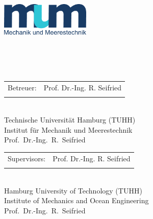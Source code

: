 \begin{titlepage}
\begin{minipage}{0.3\linewidth}
	 	 
\end{minipage}\hfill
\begin{minipage}{0.3\linewidth}
	\includegraphics[height=45pt]{Styles/mum_logo.pdf}
\end{minipage}
\vspace{8mm}
\begin{center}
	\vspace{10mm}
    {\ThemaDerArbeit}
	{\ThemaArbeitZweitSprache}
	\vspace{10mm}
	{\hspace{20mm}{\normalsize von}\large\\
	}{}
	{\hspace{20mm}{\normalsize by}\large\\
	}{}
	\hspace{20mm}{\large \VornameDesStudenten \ \NachnameDesStudenten}\\
	\vspace{15mm}
	\normalsize
	{	\hspace{20mm}\begin{tabular}{rl}
			Betreuer: & Prof. Dr.-Ing. R. Seifried \\
			& \Betreuer
		\end{tabular}\\
			\vfill
			\large
			\hspace{20mm}Technische Universität Hamburg (TUHH) \\
			\hspace{20mm}Institut für Mechanik und Meerestechnik\\
			\hspace{20mm}Prof.\ Dr.-Ing.\ R.\ Seifried
		}{}
	{	\hspace{20mm}\begin{tabular}{rl}
			Supervisors: & Prof. Dr.-Ing. R. Seifried \\
			& \Betreuer
		\end{tabular}\\
			\vfill
			\large
			\hspace{20mm}Hamburg University of Technology (TUHH) \\
			\hspace{20mm}Institute of Mechanics and Ocean Engineering\\
			\hspace{20mm}Prof.\ Dr.-Ing.\ R.\ Seifried
		}{}


\end{center}
\end{titlepage}
